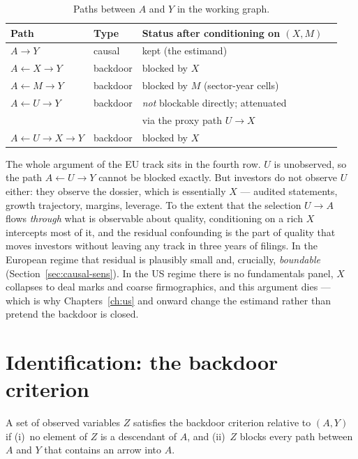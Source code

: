 \begin{table}[htbp]
\centering
\caption{Paths between $A$ and $Y$ in the working graph.}
\label{tab:causal-paths}
\begin{tabular}{@{}llll@{}}
\toprule
Path & Type & Status after conditioning on $(X, M)$ \\
\midrule
$A \to Y$ & causal & kept (the estimand) \\
$A \leftarrow X \to Y$ & backdoor & blocked by $X$ \\
$A \leftarrow M \to Y$ & backdoor & blocked by $M$ (sector-year cells) \\
$A \leftarrow U \to Y$ & backdoor & \emph{not} blockable directly; attenuated \\
 & & via the proxy path $U \to X$ \\
$A \leftarrow U \to X \to Y$ & backdoor & blocked by $X$ \\
\bottomrule
\end{tabular}
\end{table}

The whole argument of the EU track sits in the fourth row. $U$ is unobserved, so the
path $A \leftarrow U \to Y$ cannot be blocked exactly. But investors do not observe $U$
either: they observe the dossier, which is essentially $X$ --- audited statements,
growth trajectory, margins, leverage. To the extent that the selection $U \to A$ flows
\emph{through} what is observable about quality, conditioning on a rich $X$ intercepts
most of it, and the residual confounding is the part of quality that moves investors
without leaving any track in three years of filings. In the European regime that
residual is plausibly small and, crucially, \emph{boundable}
(Section~\ref{sec:causal-sens}). In the US regime there is no fundamentals panel, $X$
collapses to deal marks and coarse firmographics, and this argument dies --- which is
why Chapters~\ref{ch:us} and onward change the estimand rather than pretend the backdoor
is closed.

\section{Identification: the backdoor criterion}
\label{sec:causal-backdoor}

\begin{definition}
\label{def:causal-backdoor}
A set of observed variables $Z$ satisfies the backdoor criterion relative to $(A, Y)$
if (i)~no element of $Z$ is a descendant of $A$, and (ii)~$Z$ blocks every path between
$A$ and $Y$ that contains an arrow into $A$.
\end{definition}

